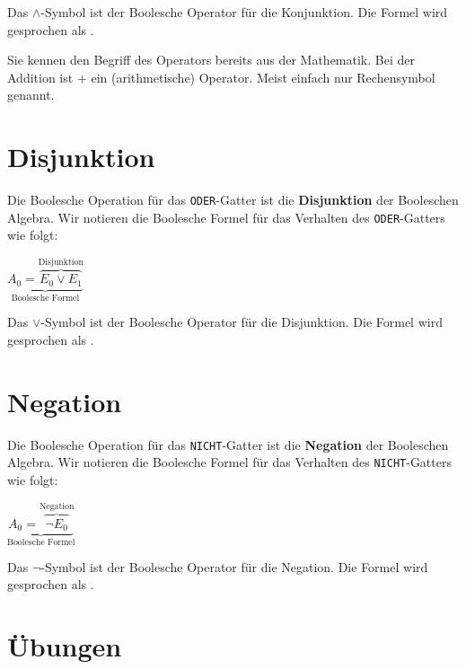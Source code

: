 Das $\wedge$-Symbol ist der Boolesche Operator für die Konjunktion. Die Formel wird gesprochen als .

\begin{hinweis}
Sie kennen den Begriff des Operators bereits aus der Mathematik. Bei der Addition ist $+$ ein (arithmetische) Operator. Meist einfach nur Rechensymbol genannt.
\end{hinweis}

\section{Disjunktion}

Die Boolesche Operation für das \texttt{ODER}-Gatter ist die \textbf{Disjunktion} der Booleschen Algebra. Wir notieren die Boolesche Formel für das Verhalten des \texttt{ODER}-Gatters wie folgt:

\begin{center}
\Large
$\underbrace{A_0 = \overbrace{E_0 \vee E_1}^{\text{Disjunktion}}}_{\text{Boolesche Formel}}$
\end{center}

Das $\vee$-Symbol ist der Boolesche Operator für die Disjunktion. Die Formel wird gesprochen als .

\section{Negation}

Die Boolesche Operation für das \texttt{NICHT}-Gatter ist die \textbf{Negation} der Booleschen Algebra. Wir notieren die Boolesche Formel für das Verhalten des \texttt{NICHT}-Gatters wie folgt:

\begin{center}
\Large
$\underbrace{A_0 = \overbrace{\neg E_0}^{\text{Negation}}}_{\text{Boolesche Formel}}$
\end{center}

Das $\neg$-Symbol ist der Boolesche Operator für die Negation. Die Formel wird gesprochen als .

\section{Übungen}

